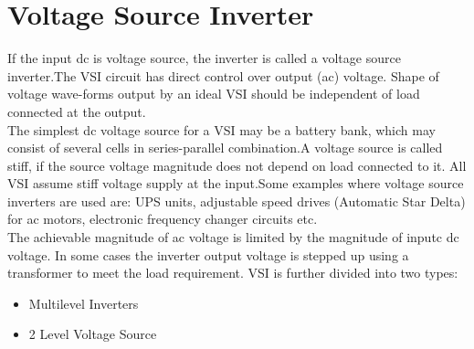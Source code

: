 \section{Voltage Source Inverter}
 If the input dc is voltage source, the inverter is called a voltage
source inverter.The VSI circuit has direct control over output (ac)
voltage. Shape of voltage wave-forms output by an ideal VSI should be independent of load connected at the output.\\
The simplest dc voltage source for a VSI may be a battery bank, which may consist of several cells in series-parallel combination.A voltage source is called stiff, if the source voltage magnitude does not depend on load connected to it. All VSI assume stiff voltage supply at the input.Some examples where voltage source inverters are used are: UPS units, adjustable speed drives (Automatic Star Delta) for ac motors, electronic frequency changer circuits etc.\\
The achievable magnitude of ac voltage is limited by the magnitude of inputc dc voltage. In some cases the inverter output voltage is stepped up using a transformer to meet the load requirement. 
VSI is further divided into two types:
\begin{itemize}
\item Multilevel Inverters
\item 2 Level Voltage Source
\end{itemize}
